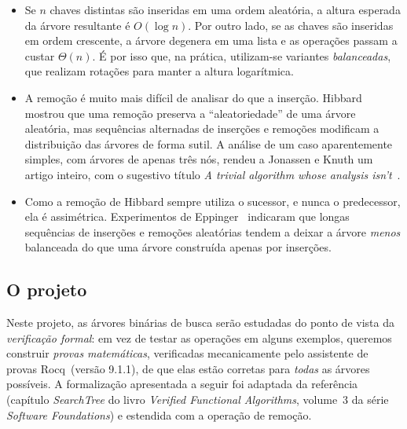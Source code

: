 \documentclass[11pt,a4paper]{article}
\newcommand{\rocq}{\textsf{Rocq}}
\begin{document}
\begin{tcolorbox}[enhanced,breakable,colback=unbblue!4,colframe=unbblue!60,
  boxrule=0.6pt,arc=2mm,left=10pt,right=10pt,fonttitle=\bfseries,
  title={\faLightbulb[regular]\quad Curiosidades}]
  \begin{itemize}[leftmargin=1.2em,itemsep=0.3em]
  \item Se $n$ chaves distintas são inseridas em uma ordem aleatória, a
    altura esperada da árvore resultante é $O(\log n)$. Por outro lado,
    se as chaves são inseridas em ordem crescente, a árvore degenera em
    uma lista e as operações passam a custar $\Theta(n)$. É por isso que,
    na prática, utilizam-se variantes \emph{balanceadas}, que realizam
    rotações para manter a altura logarítmica.
  \item A remoção é muito mais difícil de analisar do que a inserção.
    Hibbard mostrou que uma remoção preserva a ``aleatoriedade'' de uma
    árvore aleatória, mas sequências alternadas de inserções e remoções
    modificam a distribuição das árvores de forma sutil. A análise de um
    caso aparentemente simples, com árvores de apenas três nós, rendeu a
    Jonassen e Knuth um artigo inteiro, com o sugestivo título \emph{A
      trivial algorithm whose analysis isn't}~\cite{jonassen1978}.
  \item Como a remoção de Hibbard sempre utiliza o sucessor, e nunca o
    predecessor, ela é assimétrica. Experimentos de
    Eppinger~\cite{eppinger1983} indicaram que longas sequências de
    inserções e remoções aleatórias tendem a deixar a árvore
    \emph{menos} balanceada do que uma árvore construída apenas por
    inserções.
  \end{itemize}
\end{tcolorbox}

\subsection*{O projeto}

Neste projeto, as árvores binárias de busca serão estudadas do ponto de
vista da \emph{verificação formal}: em vez de testar as operações em
alguns exemplos, queremos construir \emph{provas matemáticas}, verificadas
mecanicamente pelo assistente de provas \rocq{}~(versão 9.1.1), de que
elas estão corretas para \emph{todas} as árvores possíveis. A formalização
apresentada a seguir foi adaptada da referência~\cite{appel} (capítulo
\emph{SearchTree} do livro \emph{Verified Functional Algorithms}, volume~3
da série \emph{Software Foundations}) e estendida com a operação de remoção.
\end{document}
